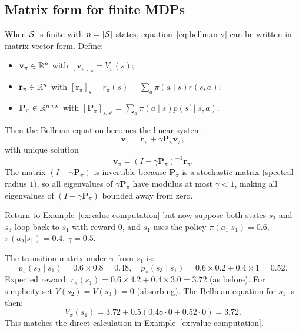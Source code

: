 \subsection*{Matrix form for finite MDPs}

When $\mathcal{S}$ is finite with $n = |\mathcal{S}|$ states, equation~\eqref{eq:bellman-v} can be written in matrix-vector form. Define:
\begin{itemize}[leftmargin=*]
  \item $\mathbf{v}_\pi \in \mathbb{R}^n$ with $[\mathbf{v}_\pi]_s = V_\pi(s)$;
  \item $\mathbf{r}_\pi \in \mathbb{R}^n$ with $[\mathbf{r}_\pi]_s = r_\pi(s) = \sum_a \pi(a \mid s) r(s,a)$;
  \item $\mathbf{P}_\pi \in \mathbb{R}^{n \times n}$ with $[\mathbf{P}_\pi]_{s,s'} = \sum_a \pi(a \mid s) p(s' \mid s, a)$.
\end{itemize}

Then the Bellman equation becomes the linear system
\begin{equation}
\label{eq:bellman-matrix}
\mathbf{v}_\pi = \mathbf{r}_\pi + \gamma \mathbf{P}_\pi \mathbf{v}_\pi,
\end{equation}
with unique solution
\begin{equation}
\label{eq:bellman-matrix-solution}
\mathbf{v}_\pi = (I - \gamma \mathbf{P}_\pi)^{-1} \mathbf{r}_\pi.
\end{equation}
The matrix $(I - \gamma \mathbf{P}_\pi)$ is invertible because $\mathbf{P}_\pi$ is a stochastic matrix (spectral radius $1$), so all eigenvalues of $\gamma \mathbf{P}_\pi$ have modulus at most $\gamma < 1$, making all eigenvalues of $(I - \gamma \mathbf{P}_\pi)$ bounded away from zero.

\begin{example}
\label{ex:bellman-system}
Return to Example~\ref{ex:value-computation} but now suppose both states $s_2$ and $s_3$ loop back to $s_1$ with reward $0$, and $s_1$ uses the policy $\pi(a_1|s_1)=0.6$, $\pi(a_2|s_1)=0.4$, $\gamma=0.5$.

The transition matrix under $\pi$ from $s_1$ is:
\[
p_\pi(s_2 \mid s_1) = 0.6 \times 0.8 = 0.48,\quad
p_\pi(s_3 \mid s_1) = 0.6 \times 0.2 + 0.4 \times 1 = 0.52.
\]
Expected reward: $r_\pi(s_1) = 0.6 \times 4.2 + 0.4 \times 3.0 = 3.72$ (as before). For simplicity set $V(s_2) = V(s_3) = 0$ (absorbing). The Bellman equation for $s_1$ is then:
\[
V_\pi(s_1) = 3.72 + 0.5 (0.48 \cdot 0 + 0.52 \cdot 0) = 3.72.
\]
This matches the direct calculation in Example~\ref{ex:value-computation}.
\end{example}


